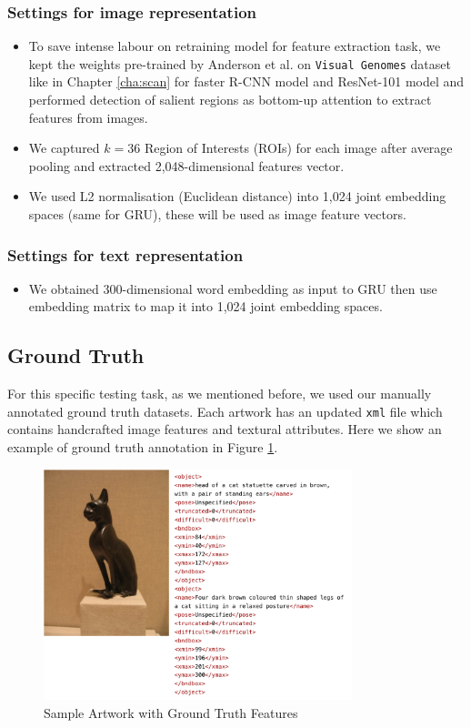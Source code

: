 \subsubsection{Settings for image representation}

\begin{itemize}
    \item To save intense labour on retraining model for feature extraction task, we kept the weights pre-trained by Anderson et al. on \verb|Visual Genomes| dataset like in Chapter \ref{cha:scan} for faster R-CNN model and ResNet-101 model and performed detection of salient regions as bottom-up attention to extract features from images. 
    \item We captured $k=36$ Region of Interests (ROIs) for each image after average pooling and extracted 2,048-dimensional features vector.
    \item We used L2 normalisation (Euclidean distance) into 1,024 joint embedding spaces (same for GRU), these will be used as image feature vectors.
\end{itemize}

\subsubsection{Settings for text representation}

\begin{itemize}
    \item We obtained 300-dimensional word embedding as input to GRU then use embedding matrix to map it into 1,024 joint embedding spaces.
\end{itemize}

\subsection{Ground Truth}

For this specific testing task, as we mentioned before, we used our manually annotated ground truth datasets. Each artwork has an updated \verb|xml| file which contains handcrafted image features and textural attributes. Here we show an example of ground truth annotation in Figure \ref{fig:sampledata}.

\begin{figure}[h!]
\centering
\includegraphics[width=0.8\textwidth]{sampledata.pdf}
\caption{Sample Artwork with Ground Truth Features}
\label{fig:sampledata}
\end{figure}

